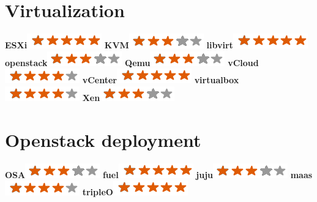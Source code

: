 \documentclass[]{friggeri-cv}
\begin{document}
\begin{aside}
    \section{Virtualization}
        \textbf{ESXi}\includegraphics[scale=0.40]{img/5stars.png}
        \textbf{KVM}\includegraphics[scale=0.40]{img/3stars.png}
        \textbf{libvirt}\includegraphics[scale=0.40]{img/5stars.png}
        \textbf{openstack}\includegraphics[scale=0.40]{img/3stars.png}
        \textbf{Qemu}\includegraphics[scale=0.40]{img/3stars.png}
        \textbf{vCloud}\includegraphics[scale=0.40]{img/4stars.png}
        \textbf{vCenter}\includegraphics[scale=0.40]{img/5stars.png}
        \textbf{virtualbox}\includegraphics[scale=0.40]{img/4stars.png}
        \textbf{Xen}\includegraphics[scale=0.40]{img/3stars.png}
	~
    \section{Openstack deployment}
        \textbf{OSA}\includegraphics[scale=0.40]{img/3stars.png}
        \textbf{fuel}\includegraphics[scale=0.40]{img/5stars.png}
        \textbf{juju}\includegraphics[scale=0.40]{img/3stars.png}
        \textbf{maas}\includegraphics[scale=0.40]{img/4stars.png}
        \textbf{tripleO}\includegraphics[scale=0.40]{img/5stars.png}
	~

\end{aside}
\end{document}
